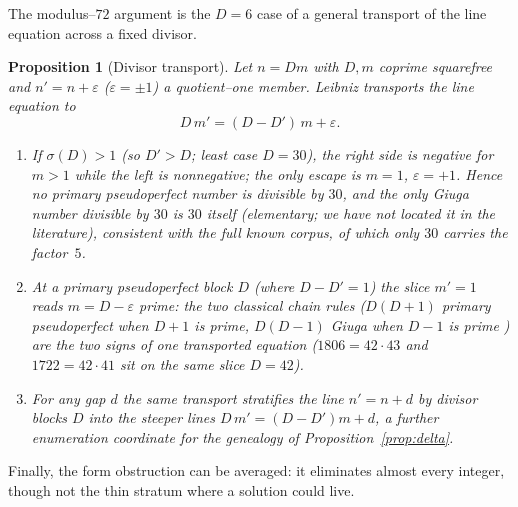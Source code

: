 \documentclass[11pt]{article}
\newtheorem{proposition}[theorem]{Proposition}
\theoremstyle{definition}
\begin{document}
The modulus--$72$ argument is the $D=6$ case of a general transport of the line equation across a fixed
divisor.

\begin{proposition}[Divisor transport]\label{prop:transport}
Let $n=Dm$ with $D,m$ coprime squarefree and $n'=n+\varepsilon$ ($\varepsilon=\pm1$) a quotient--one member.
Leibniz transports the line equation to
\[ D\,m'=(D-D')\,m+\varepsilon. \]
\begin{enumerate}[label=\textup{(\alph*)},leftmargin=2.2em]
\item If $\sigma(D)>1$ (so $D'>D$; least case $D=30$), the right side is negative for $m>1$ while the left
is nonnegative; the only escape is $m=1$, $\varepsilon=+1$. Hence \emph{no primary pseudoperfect number is
divisible by $30$, and the only Giuga number divisible by $30$ is $30$ itself} (elementary; we have not
located it in the literature), consistent with the full known corpus, of which only $30$ carries the
factor~$5$.
\item At a primary pseudoperfect block $D$ (where $D-D'=1$) the slice $m'=1$ reads $m=D-\varepsilon$ prime:
the two classical chain rules ($D(D+1)$ primary pseudoperfect when $D+1$ is prime, $D(D-1)$ Giuga when
$D-1$ is prime \cite{GrauOllerMarcenSadornil2021,SondowMacMillan2017}) are the two signs of one
transported equation ($1806=42\cdot43$ and $1722=42\cdot41$ sit on the same slice $D=42$).
\item For any gap $d$ the same transport stratifies the line $n'=n+d$ by divisor blocks $D$ into the steeper
lines $D\,m'=(D-D')m+d$, a further enumeration coordinate for the genealogy of
Proposition~\ref{prop:delta}.
\end{enumerate}
\end{proposition}

Finally, the form obstruction can be averaged: it eliminates almost every integer, though not the thin
stratum where a solution could live.
\end{document}

